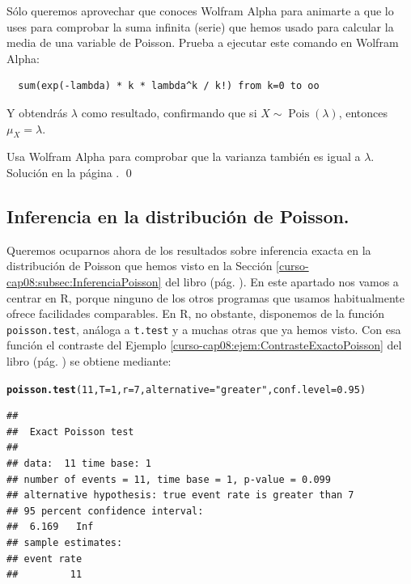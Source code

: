 \documentclass[10pt,a4paper]{article}\usepackage[]{graphicx}\usepackage[]{color}
\makeatletter
\newcommand{\hlnum}[1]{\textcolor[rgb]{0.686,0.059,0.569}{#1}}%
\newcommand{\hlstr}[1]{\textcolor[rgb]{0.192,0.494,0.8}{#1}}%
\newcommand{\hlstd}[1]{\textcolor[rgb]{0.345,0.345,0.345}{#1}}%
\newcommand{\hlkwc}[1]{\textcolor[rgb]{0.333,0.667,0.333}{#1}}%
\newcommand{\hlkwd}[1]{\textcolor[rgb]{0.737,0.353,0.396}{\textbf{#1}}}%
\newenvironment{kframe}{%
 \def\at@end@of@kframe{}%
 \ifinner\ifhmode%
  \def\at@end@of@kframe{\end{minipage}}%
  \begin{minipage}{\columnwidth}%
 \fi\fi%
 \def\FrameCommand##1{\hskip\@totalleftmargin \hskip-\fboxsep
 \colorbox{shadecolor}{##1}\hskip-\fboxsep
     \hskip-\linewidth \hskip-\@totalleftmargin \hskip\columnwidth}%
 \MakeFramed {\advance\hsize-\width
   \@totalleftmargin\z@ \linewidth\hsize
   \@setminipage}}%
 {\par\unskip\endMakeFramed%
 \at@end@of@kframe}
\newenvironment{knitrout}{}{} %
\newcounter {cont01}
\makeatother
\begin{document}
Sólo queremos aprovechar que conoces Wolfram Alpha para animarte a que lo uses para comprobar la suma infinita (serie) que hemos usado para calcular la media de una variable de Poisson. Prueba a ejecutar este comando en Wolfram Alpha:

\begin{verbatim}
  sum(exp(-lambda) * k * lambda^k / k!) from k=0 to oo
\end{verbatim}
Y obtendrás $\lambda$ como resultado, confirmando que si $X\sim \operatorname{Pois}(\lambda)$, entonces $\mu_X = \lambda$.

\begin{ejercicio}
\label{tut08:ejercicio05}
Usa Wolfram Alpha para comprobar que la varianza también es igual a $\lambda$.
Solución en la página \pageref{tut08:ejercicio05:sol}.
\qed
\end{ejercicio}


\subsection{Inferencia en la distribución de Poisson.}

Queremos ocuparnos ahora de los resultados sobre inferencia exacta en la distribución de Poisson que hemos visto en la Sección \ref{curso-cap08:subsec:InferenciaPoisson} del libro (pág. \pageref{curso-cap08:subsec:InferenciaPoisson}). En este apartado nos vamos a centrar en R, porque ninguno de los otros programas que usamos habitualmente ofrece facilidades comparables. En R, no obstante, disponemos de la función {\tt poisson.test}, análoga a {\tt t.test} y a muchas otras que ya hemos visto. Con esa función el contraste del Ejemplo \ref{curso-cap08:ejem:ContrasteExactoPoisson} del libro (pág. \pageref{curso-cap08:ejem:ContrasteExactoPoisson}) se obtiene mediante:

\begin{knitrout}
\color{fgcolor}\begin{kframe}
\begin{alltt}
\hlkwd{poisson.test}\hlstd{(}\hlnum{11}\hlstd{,} \hlkwc{T}\hlstd{=}\hlnum{1}\hlstd{,} \hlkwc{r}\hlstd{=}\hlnum{7}\hlstd{,} \hlkwc{alternative}\hlstd{=}\hlstr{"greater"}\hlstd{,} \hlkwc{conf.level}\hlstd{=}\hlnum{0.95}\hlstd{)}
\end{alltt}
\begin{verbatim}
## 
## 	Exact Poisson test
## 
## data:  11 time base: 1
## number of events = 11, time base = 1, p-value = 0.099
## alternative hypothesis: true event rate is greater than 7
## 95 percent confidence interval:
##  6.169   Inf
## sample estimates:
## event rate 
##         11
\end{verbatim}
\end{kframe}
\end{knitrout}
\end{document}
